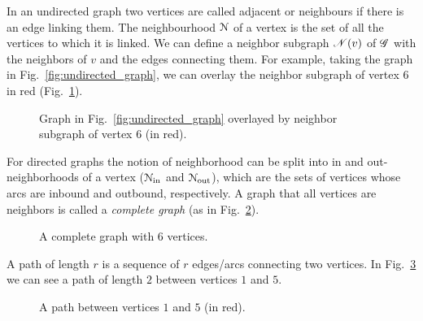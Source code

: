 \documentclass[../main.tex]{subfiles}
\begin{document}
\pagebreak
In an undirected graph two vertices are called adjacent or neighbours if there is an edge linking them.
The neighbourhood $\mathcal{N}$ of a vertex is the set of all the vertices to which it is linked.
We can define a neighbor subgraph $\mathscr{N}(v)$ of $\mathscr{G}$ with the neighbors of $v$ and the edges connecting them. For example, taking the graph in Fig.~\ref{fig:undirected_graph}, we can overlay the neighbor subgraph of vertex $6$ in red (Fig.~\ref{fig:neighbor_subgraph}).


\begin{figure}[h]
  \centering
  \caption[Neighbor subgraph of vertex $6$ (in red).]{Graph in Fig.~\ref{fig:undirected_graph} overlayed by neighbor subgraph of vertex $6$ (in red).}\label{fig:neighbor_subgraph}
\end{figure}

For directed graphs the notion of neighborhood can be split into in and out-neighborhoods of a vertex ($\mathcal{N}_{\text{in}}$ and $\mathcal{N}_{\text{out}}$), which are the sets of vertices whose arcs are inbound and outbound, respectively.
A graph that all vertices are neighbors is called a \emph{complete graph} (as in Fig.~\ref{fig:complete_graph}).

\begin{figure}[h]
    \centering
    \caption{A complete graph with 6 vertices.}\label{fig:complete_graph}
\end{figure}

A path of length $r$ is a sequence of $r$ edges/arcs connecting two vertices. In Fig.~\ref{fig:a_path} we can see a path of length $2$ between vertices $1$ and $5$.

\begin{figure}[h]
  \centering
  \caption{A path between vertices $1$ and $5$ (in red).}\label{fig:a_path}
\end{figure}
\end{document}
